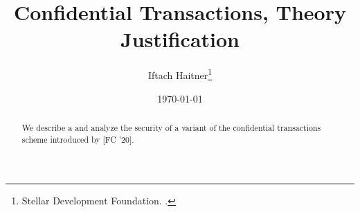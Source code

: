 \documentclass[11pt]{article}
\title{Confidential Transactions,   Theory Justification 
\Draft{\\ \Large Draft, Please do not Distribute}}
\author{Iftach Haitner\thanks{Stellar Development Foundation. \email{ iftach.haitner@stellar.org}.}}
\date{\today}
\begin{document}
 
 \sloppy
 
  
\maketitle


\begin{abstract}
We describe a and analyze the security of  a variant of the confidential transactions   scheme introduced by  \citeauthor {BunzAZB20} [FC '20]. 
\end{abstract}

\tableofcontents
\newpage 







\printbibliography
\end{document}
